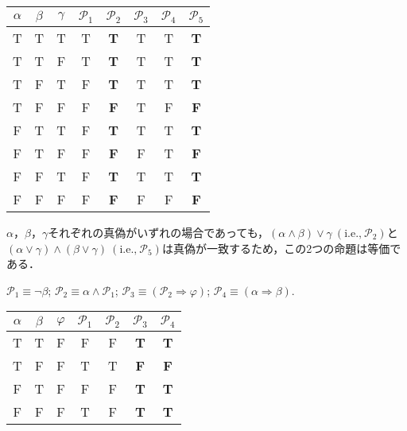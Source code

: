 \documentclass[uplatex,11pt]{jsarticle}
\def\shoumon#1{\vspace{1em}\noindent\ovalbox{\textsf{ #1 }}}
\begin{document}
\begin{center}
	\begin{tabular}{ccc|ccccc} \hline\hline
		$\alpha$ & $\beta$ & $\gamma$ & $\mathscr{P}_1$ & $\mathscr{P}_2$ & $\mathscr{P}_3$ & $\mathscr{P}_4$ & $\mathscr{P}_5$ \\ \hline
		T & T & T & T & \textbf{T} & T & T & \textbf{T} \\
		T & T & F & T & \textbf{T} & T & T & \textbf{T} \\
		T & F & T & F & \textbf{T} & T & T & \textbf{T} \\
		T & F & F & F & \textbf{F} & T & F & \textbf{F} \\
		F & T & T & F & \textbf{T} & T & T & \textbf{T} \\
		F & T & F & F & \textbf{F} & F & T & \textbf{F} \\
		F & F & T & F & \textbf{T} & T & T & \textbf{T} \\
		F & F & F & F & \textbf{F} & F & F & \textbf{F} \\ \hline\hline
	\end{tabular} 
\end{center}

$\alpha$，$\beta$，$\gamma$それぞれの真偽がいずれの場合であっても，$(\alpha \wedge \beta) \vee \gamma\ (\text{i.e.,}\ \mathscr{P}_2)$と$(\alpha \vee \gamma) \wedge (\beta \vee \gamma)\ (\text{i.e.,}\ \mathscr{P}_5)$は真偽が一致するため，この2つの命題は等価である．


\shoumon{(2) - 背理法}

$\mathscr{P}_1 \equiv \neg\beta$;\quad
$\mathscr{P}_2 \equiv \alpha \wedge \mathscr{P}_1$;\quad
$\mathscr{P}_3 \equiv (\mathscr{P}_2 \Longrightarrow \varphi)$;\quad
$\mathscr{P}_4 \equiv (\alpha \Longrightarrow \beta)$.

\begin{center}
	\begin{tabular}{ccc|cccc} \hline\hline
		$\alpha$ & $\beta$ & $\varphi$ & $\mathscr{P}_1$ & $\mathscr{P}_2$ & $\mathscr{P}_3$ & $\mathscr{P}_4$ \\ \hline
		T & T & F & F & F & \textbf{T} & \textbf{T} \\
		T & F & F & T & T & \textbf{F} & \textbf{F} \\
		F & T & F & F & F & \textbf{T} & \textbf{T} \\
		F & F & F & T & F & \textbf{T} & \textbf{T} \\ \hline\hline
	\end{tabular} 
\end{center}
\end{document}

